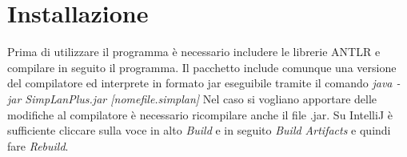 \documentclass[../main]{subfiles}
\begin{document}
\section{Installazione}
Prima di utilizzare il programma è necessario includere le librerie ANTLR e compilare in seguito il programma.
Il pacchetto include comunque una versione del compilatore ed interprete in formato jar eseguibile tramite il comando
\textit{java -jar SimpLanPlus.jar [nomefile.simplan] }
Nel caso si vogliano apportare delle modifiche al compilatore è necessario ricompilare anche il file .jar.
Su IntelliJ è sufficiente cliccare sulla voce in alto \textit{Build} e in seguito \textit{Build Artifacts} e quindi fare \textit{Rebuild}.
\end{document}
